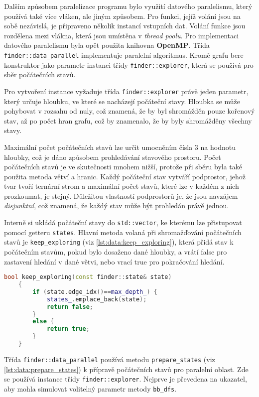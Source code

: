 Dalším způsobem paralelizace programu bylo využití datového paralelismu, který používá také více vláken, ale jiným způsobem.
Pro funkci, jejíž volání jsou na sobě nezávislá, je připraveno několik instancí vstupních dat.
Volání funkce jsou rozdělena mezi vlákna, která jsou umístěna v \textit{thread poolu}.
Pro implementaci datového paralelismu byla opět použita knihovna \textbf{OpenMP}.
Třída \texttt{finder::data\_parallel} implementuje paralelní algoritmus.
Kromě grafu bere konstruktor jako parametr instanci třídy \texttt{finder::explorer}, která se používá pro sběr počátečních stavů. 

Pro vytvoření instance vyžaduje třída \texttt{finder::explorer}  právě jeden parametr, který určuje hloubku, ve které se nacházejí počáteční stavy.
Hloubka se může pohybovat v rozsahu od nuly, což znamená, že by byl shromážděn pouze kořenový stav, až po počet hran grafu, což by znamenalo, že by byly shromážděny všechny stavy.

Maximální počet počátečních stavů lze určit umocněním čísla 3 na hodnotu hloubky, což je dáno způsobem prohledávání stavového prostoru.
Počet počátečních stavů je ve skutečnosti mnohem nižší, protože při sběru byla také použita metoda větví a hranic.
Každý počáteční stav vytváří podprostor, jehož tvar tvoří ternární strom a maximální počet stavů, které lze v každém z nich prozkoumat, je stejný.
Důležitou vlastností podprostorů je, že jsou navzájem \textit{disjunktní}, což znamená, že každý stav může být prohledán právě jednou.

Interně si ukládá počáteční stavy do \texttt{std::vector}, ke kterému lze přistupovat pomocí getteru \texttt{states}.
Hlavní metoda volaná při shromažďování počátečních stavů je \texttt{keep\_exploring} (viz \ref{lst:data:keep_exploring}), která přidá stav k počátečním stavům, pokud bylo dosaženo dané hloubky, a vrátí false pro zastavení hledání v dané větvi, nebo vrací true pro pokračování hledání.

\begin{lstlisting}[language=C++, label={lst:data:keep_exploring}, caption={Metoda pro řízení prohledávání}]
    bool keep_exploring(const finder::state& state)
    {
        if (state.edge_idx()==max_depth_) {
            states_.emplace_back(state);
            return false;
        }
        else {
            return true;
        }
    }
\end{lstlisting}

Třída \texttt{finder::data\_parallel} používá metodu \texttt{prepare\_states} (viz \ref{lst:data:prepare_states}) k přípravě počátečních stavů pro paralelní oblast.
Zde se používá instance třídy \texttt{finder::explorer}.
Nejprve je převedena na ukazatel, aby mohla simulovat volitelný parametr metody \texttt{bb\_dfs}.

